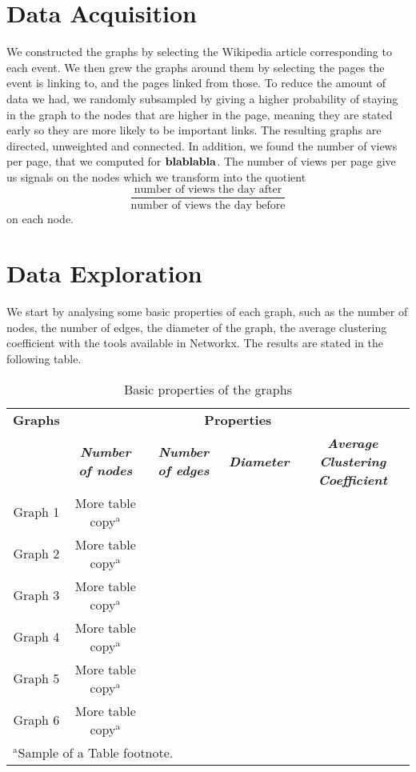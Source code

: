 \documentclass{article}
\begin{document}
\section{Data Acquisition}

We constructed the graphs by selecting the Wikipedia article corresponding to each event. We then grew the graphs around them by selecting the pages the event is linking to, and the pages linked from those. To reduce the amount of data we had, we randomly subsampled by giving a higher probability of staying in the graph to the nodes that are higher in the page, meaning they are stated early so they are more likely to be important links. The resulting graphs are directed, unweighted and connected. In addition, we found the number of views per page, that we computed for $\bf{ blablabla}$. 
The number of views per page give us signals on the nodes which we transform into the quotient \[\frac{\text{number of views the day after} }{\text{number of views the day before}}\] on each node. 




\section{Data Exploration}

We start by analysing some basic properties of each graph, such as the number of nodes, the number of edges, the diameter of the graph, the average clustering coefficient with the tools available in Networkx. The results are stated in the  following table. 

\begin{table}[htbp]
\caption{Basic properties of the graphs}
\begin{center}
\begin{tabular}{|c|c|c|c|c|}
\hline
\textbf{Graphs}&\multicolumn{4}{|c|}{\textbf{Properties}} \\
\cline{2-5} 
\textbf{ } & \textbf{\textit{Number of nodes}}& \textbf{\textit{Number of edges}}& \textbf{\textit{Diameter}} & \textbf{\textit{Average Clustering Coefficient}}\\
\hline
Graph 1 & More table copy$^{\mathrm{a}}$& & & \\
\hline
Graph 2& More table copy$^{\mathrm{a}}$& & & \\
\hline
Graph 3& More table copy$^{\mathrm{a}}$& & & \\
\hline
Graph 4& More table copy$^{\mathrm{a}}$& & & \\
\hline
Graph 5& More table copy$^{\mathrm{a}}$& & & \\
\hline
Graph 6 & More table copy$^{\mathrm{a}}$& & & \\
\hline
\multicolumn{4}{l}{$^{\mathrm{a}}$Sample of a Table footnote.} \\
\end{tabular}
\label{tab1}
\end{center}
\end{table}
\end{document}
